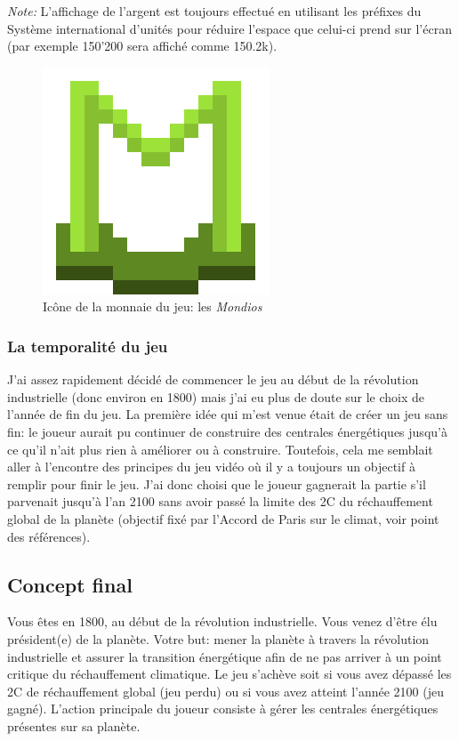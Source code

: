 \documentclass{article}
\begin{document}
		
		\textit{Note: }L'affichage de l'argent est toujours effectué en utilisant les préfixes du Système international d'unités pour réduire l'espace que celui-ci prend sur l'écran (par exemple 150'200 sera affiché comme 150.2k).
		\begin{figure}[H]
                \centerline{\includegraphics[scale=.5]{../images/mondiosLogo}}
                \caption{Icône de la monnaie du jeu: les \textit{Mondios}}
                \label{fig:mondiosLogo}
        \end{figure}
        
        
        \subsubsection{La temporalité du jeu}	
        J'ai assez rapidement décidé de commencer le jeu au début de la révolution industrielle (donc environ en 1800) mais j'ai eu plus de doute sur le choix de l'année de fin du jeu. La première idée qui m'est venue était de créer un jeu sans fin: le joueur aurait pu continuer de construire des centrales énergétiques jusqu'à ce qu'il n'ait plus rien à améliorer ou à construire. Toutefois, cela me semblait aller à l'encontre des principes du jeu vidéo où il y a toujours un objectif à remplir pour finir le jeu. J'ai donc choisi que le joueur gagnerait la partie s'il parvenait jusqu'à l'an 2100 sans avoir passé la limite des 2\degree C du réchauffement global de la planète (objectif fixé par l'Accord de Paris sur le climat, voir point \cite{objsParis2100} des références).
		
        \subsection{Concept final}
		Vous êtes en 1800, au début de la révolution industrielle. Vous venez d'être élu président(e) de la planète. Votre but: mener la planète à travers la révolution industrielle et assurer la transition énergétique afin de ne pas arriver à un point critique du réchauffement climatique. Le jeu s'achève soit si vous avez dépassé les 2\degree C de réchauffement global (jeu perdu) ou si vous avez atteint l'année 2100 (jeu gagné).
        L'action principale du joueur consiste à gérer les centrales énergétiques présentes sur sa planète.
\end{document}

